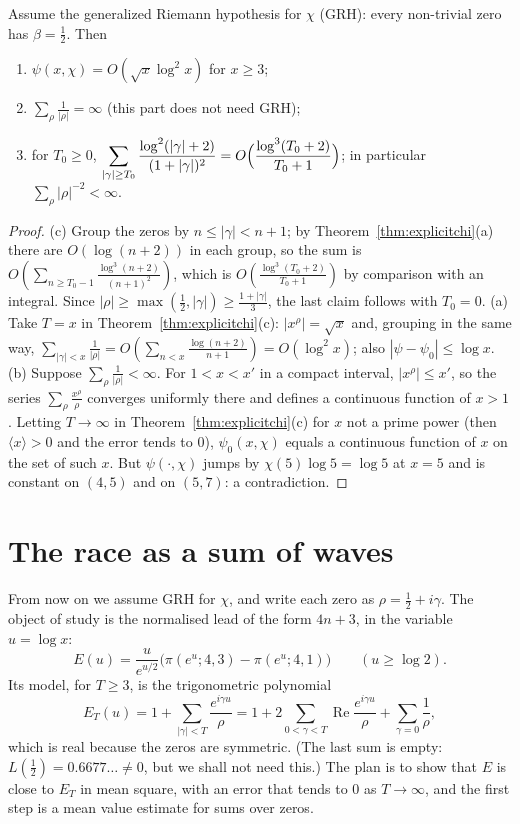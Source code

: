 \begin{corollary}\label{cor:grhchi}
Assume the generalized Riemann hypothesis for $\chi$ (GRH): every non-trivial zero has $\beta=\frac12$. Then
\begin{enumerate}[label=(\alph*)]
\item $\psi(x,\chi)=O(\sqrt x\log^2x)$ for $x\ge3$;
\item $\sum_\rho\frac1{|\rho|}=\infty$ (this part does not need GRH);
\item for $T_0\ge0$, $\displaystyle\sum_{|\gamma|\ge T_0}\frac{\log^2(|\gamma|+2)}{(1+|\gamma|)^2}=O\Bigl(\frac{\log^3(T_0+2)}{T_0+1}\Bigr)$; in particular $\sum_\rho|\rho|^{-2}<\infty$.
\end{enumerate}
\end{corollary}
\begin{proof}
(c) Group the zeros by $n\le|\gamma|<n+1$; by Theorem~\ref{thm:explicitchi}(a) there are $O(\log(n+2))$ in each group, so the sum is $O(\sum_{n\ge T_0-1}\frac{\log^3(n+2)}{(n+1)^2})$, which is $O(\frac{\log^3(T_0+2)}{T_0+1})$ by comparison with an integral. Since $|\rho|\ge\max(\frac12,|\gamma|)\ge\frac{1+|\gamma|}3$, the last claim follows with $T_0=0$. (a) Take $T=x$ in Theorem~\ref{thm:explicitchi}(c): $|x^\rho|=\sqrt x$ and, grouping in the same way, $\sum_{|\gamma|<x}\frac1{|\rho|}=O(\sum_{n<x}\frac{\log(n+2)}{n+1})=O(\log^2x)$; also $|\psi-\psi_0|\le\log x$. (b) Suppose $\sum_\rho\frac1{|\rho|}<\infty$. For $1<x<x'$ in a compact interval, $|x^\rho|\le x'$, so the series $\sum_\rho\frac{x^\rho}\rho$ converges uniformly there and defines a continuous function of $x>1$. Letting $T\to\infty$ in Theorem~\ref{thm:explicitchi}(c) for $x$ not a prime power (then $\langle x\rangle>0$ and the error tends to $0$), $\psi_0(x,\chi)$ equals a continuous function of $x$ on the set of such $x$. But $\psi(\cdot,\chi)$ jumps by $\chi(5)\log5=\log5$ at $x=5$ and is constant on $(4,5)$ and on $(5,7)$: a contradiction.
\end{proof}

\section{The race as a sum of waves}

From now on we assume GRH for $\chi$, and write each zero as $\rho=\frac12+i\gamma$. The object of study is the normalised lead of the form $4n+3$, in the variable $u=\log x$:
\[
E(u)=\frac u{e^{u/2}}\bigl(\pi(e^u;4,3)-\pi(e^u;4,1)\bigr)\qquad(u\ge\log2).
\]
Its model, for $T\ge3$, is the trigonometric polynomial
\[
E_T(u)=1+\sum_{|\gamma|<T}\frac{e^{i\gamma u}}\rho=1+2\sum_{0<\gamma<T}\operatorname{Re}\frac{e^{i\gamma u}}\rho+\sum_{\gamma=0}\frac1\rho,
\]
which is real because the zeros are symmetric. (The last sum is empty: $L(\frac12)=0.6677\ldots\ne0$, but we shall not need this.) The plan is to show that $E$ is close to $E_T$ in mean square, with an error that tends to $0$ as $T\to\infty$, and the first step is a mean value estimate for sums over zeros.

